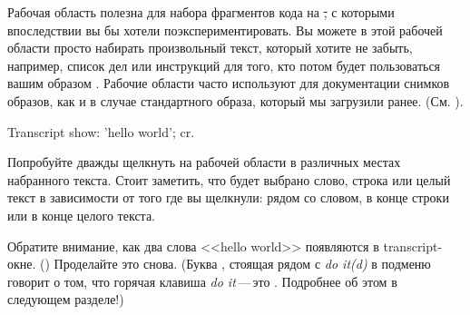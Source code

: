 \documentclass[a4paper,10pt,twoside]{book}
\begin{document}

Рабочая область полезна для набора фрагментов кода на  \st,
с которыми впоследствии вы  бы хотели поэкспериментировать.
Вы можете в этой рабочей области просто набирать произвольный текст,
который хотите не забыть, например, список дел или инструкций для
того, кто потом будет пользоваться вашим образом \pharo.
Рабочие области часто используют для документации снимков образов,
как и в случае стандартного образа, который мы загрузили ранее.
(См. ).

\begin{code}{}
Transcript show: 'hello world'; cr.
\end{code}


Попробуйте дважды щелкнуть на рабочей области в различных местах
набранного текста. Стоит заметить, что будет выбрано слово,
строка или целый текст в зависимости от того где вы щелкнули:
рядом со словом, в конце строки или в конце целого текста. 




Обратите внимание, как два слова <<hello world>> появляются
в transcript-окне. () Проделайте это снова.
(Буква , стоящая рядом с \emph{do it(d)} в подменю
говорит о том, что горячая клавиша \emph{do it}\,---\,это .
Подробнее об этом в следующем разделе!) 
\end{document}
